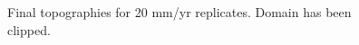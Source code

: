 \documentclass[a4paper]{article}
\begin{document}
\begin{appendices}
\begin{figure}[!ht]
	\caption{Final topographies for 20 mm/yr replicates. Domain has been clipped.}
	\label{fig:020topo}
\end{figure}


\end{appendices}
\end{document}
